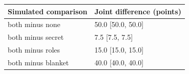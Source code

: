 \begin{tabular}{ll}\toprule
Simulated comparison & Joint difference (points) \\
\midrule
both minus none & 50.0 [50.0, 50.0] \\
both minus secret & 7.5 [7.5, 7.5] \\
both minus roles & 15.0 [15.0, 15.0] \\
both minus blanket & 40.0 [40.0, 40.0] \\
\bottomrule\end{tabular}
